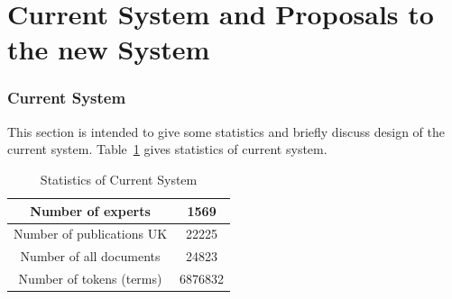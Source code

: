 
\section{Current System and Proposals to the new System}

\subsubsection{Current System}\label{sec:currentsystem}
This section is intended to give some statistics and briefly discuss design of the current system. Table~\ref{table:currentstats} gives statistics 
of current system.
\begin{table}
\centering
\begin{tabular}{|c|c|}
\hline Number of experts & 1569 \\
\hline Number of publications UK & 22225 \\
\hline Number of all documents   & 24823 \\ 
\hline Number of tokens (terms) & 6876832 \\
\hline
\end{tabular}
\caption{Statistics of Current System} \label{table:currentstats}
\end{table}

